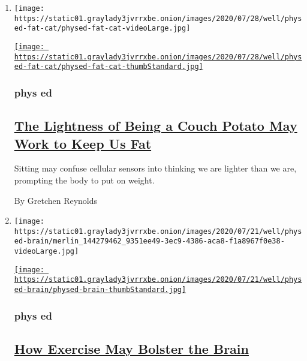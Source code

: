 \begin{enumerate}
\def\labelenumi{\arabic{enumi}.}
\item
  \texttt{[image: https://static01.graylady3jvrrxbe.onion/images/2020/07/28/well/physed-fat-cat/physed-fat-cat-videoLarge.jpg]}

  \href{/2020/07/22/well/move/the-lightness-of-being-a-couch-potato-may-work-to-keep-us-fat.html}{\texttt{[image: https://static01.graylady3jvrrxbe.onion/images/2020/07/28/well/physed-fat-cat/physed-fat-cat-thumbStandard.jpg]}}

  \hypertarget{phys-ed}{%
  \subsubsection{phys ed}\label{phys-ed}}

  \hypertarget{the-lightness-of-being-a-couch-potato-may-work-to-keep-us-fat}{%
  \subsection{\texorpdfstring{\href{/2020/07/22/well/move/the-lightness-of-being-a-couch-potato-may-work-to-keep-us-fat.html}{The
  Lightness of Being a Couch Potato May Work to Keep Us
  Fat}}{The Lightness of Being a Couch Potato May Work to Keep Us Fat}}\label{the-lightness-of-being-a-couch-potato-may-work-to-keep-us-fat}}

  Sitting may confuse cellular sensors into thinking we are lighter than
  we are, prompting the body to put on weight.

  By Gretchen Reynolds
\item
  \texttt{[image: https://static01.graylady3jvrrxbe.onion/images/2020/07/21/well/physed-brain/merlin\_144279462\_9351ee49-3ec9-4386-aca8-f1a8967f0e38-videoLarge.jpg]}

  \href{/2020/07/15/well/move/how-exercise-may-bolster-the-brain.html}{\texttt{[image: https://static01.graylady3jvrrxbe.onion/images/2020/07/21/well/physed-brain/physed-brain-thumbStandard.jpg]}}

  \hypertarget{phys-ed-1}{%
  \subsubsection{phys ed}\label{phys-ed-1}}

  \hypertarget{how-exercise-may-bolster-the-brain}{%
  \subsection{\texorpdfstring{\href{/2020/07/15/well/move/how-exercise-may-bolster-the-brain.html}{How
  Exercise May Bolster the
  Brain}}{How Exercise May Bolster the Brain}}\label{how-exercise-may-bolster-the-brain}}


\end{enumerate}
